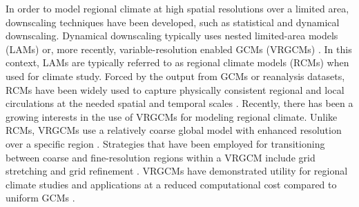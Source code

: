 \documentclass[ms]{agutex}   %
\begin{document}
\begin{article}
In order to model regional climate at high spatial resolutions over a limited area, downscaling techniques have been developed, such as statistical and dynamical downscaling. Dynamical downscaling typically uses nested limited-area models (LAMs) or, more recently, variable-resolution enabled GCMs (VRGCMs) \citep{laprise2008regional}. In this context, LAMs are typically referred to as regional climate models (RCMs) when used for climate study. Forced by the output from GCMs or reanalysis datasets, RCMs have been widely used to capture physically consistent regional and local circulations at the needed spatial and temporal scales \citep{christensen2007regional, bukovsky2009precipitation, mearns2012north}. Recently, there has been a growing interests in the use of VRGCMs for modeling regional climate. Unlike RCMs, VRGCMs use a relatively coarse global model with enhanced resolution over a specific region \citep{staniforth1978variable, fox1997finite}.  Strategies that have been employed for transitioning between coarse and fine-resolution regions within a VRGCM include grid stretching \citep{fox1997finite, mcgregor2008updated} and grid refinement \citep{ringler2008multiresolution, skamarock2012multiscale, zarzycki2014aquaplanet}. VRGCMs have demonstrated utility for regional climate studies and applications at a reduced computational cost compared to uniform GCMs \citep{fox2006variable, rauscher2013exploring, zarzycki2015effects}. 


\end{article}
\end{document}
